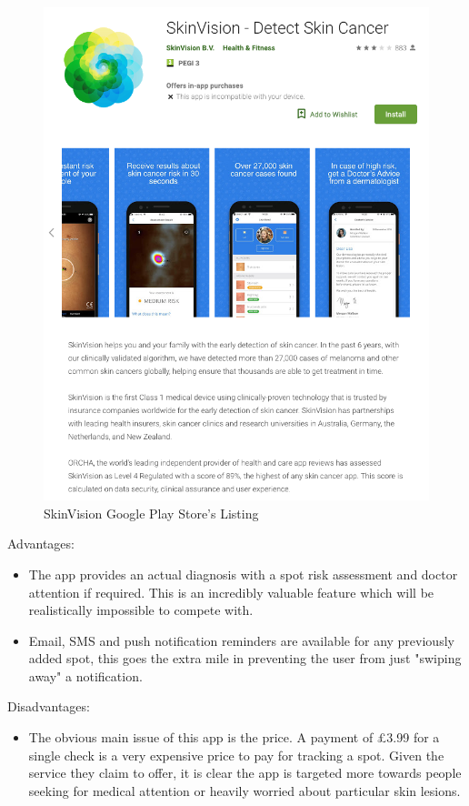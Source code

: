 \begin{figure}
    \includegraphics[width=1\textwidth, center]{figures/skinvision_listing.png}
    \caption{SkinVision Google Play Store's Listing}
    \label{fig:skinvision}
\end{figure}

Advantages:
\begin{itemize}
    \item The app provides an actual diagnosis with a spot risk assessment and doctor attention if required. This is an incredibly valuable feature which will be realistically impossible to compete with.
    \item Email, SMS and push notification reminders are available for any previously added spot, this goes the extra mile in preventing the user from just "swiping away" a notification.
\end{itemize}

Disadvantages:
\begin{itemize}
    \item The obvious main issue of this app is the price. A payment of \pounds3.99 for a single check is a very expensive price to pay for tracking a spot. Given the service they claim to offer, it is clear the app is targeted more towards people seeking for medical attention or heavily worried about particular skin lesions. 
\end{itemize}


